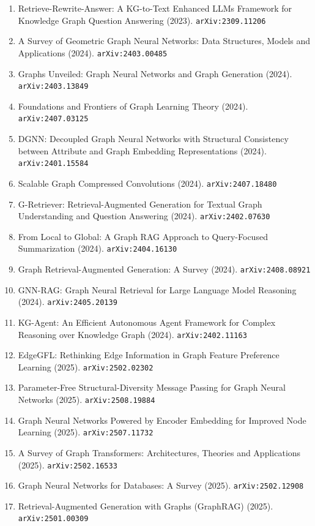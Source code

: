 \documentclass[11pt]{article}
\begin{document}
\begin{enumerate}
  Tasks (2023). \texttt{arXiv:2310.00149}
  \item Retrieve-Rewrite-Answer: A KG-to-Text Enhanced LLMs Framework for
  Knowledge Graph Question Answering (2023). \texttt{arXiv:2309.11206}
  \item A Survey of Geometric Graph Neural Networks: Data Structures, Models and Applications (2024). \texttt{arXiv:2403.00485}
  \item Graphs Unveiled: Graph Neural Networks and Graph Generation (2024). \texttt{arXiv:2403.13849}
  \item Foundations and Frontiers of Graph Learning Theory (2024). \texttt{arXiv:2407.03125}
  \item DGNN: Decoupled Graph Neural Networks with Structural Consistency
  between Attribute and Graph Embedding Representations (2024). \texttt{arXiv:2401.15584}
  \item Scalable Graph Compressed Convolutions (2024). \texttt{arXiv:2407.18480}
  \item G-Retriever: Retrieval-Augmented Generation for Textual Graph
  Understanding and Question Answering (2024). \texttt{arXiv:2402.07630}
  \item From Local to Global: A Graph RAG Approach to Query-Focused
  Summarization (2024). \texttt{arXiv:2404.16130}
  \item Graph Retrieval-Augmented Generation: A Survey (2024). \texttt{arXiv:2408.08921}
  \item GNN-RAG: Graph Neural Retrieval for Large Language Model Reasoning (2024). \texttt{arXiv:2405.20139}
  \item KG-Agent: An Efficient Autonomous Agent Framework for Complex Reasoning
  over Knowledge Graph (2024). \texttt{arXiv:2402.11163}
  \item EdgeGFL: Rethinking Edge Information in Graph Feature Preference
  Learning (2025). \texttt{arXiv:2502.02302}
  \item Parameter-Free Structural-Diversity Message Passing for Graph Neural Networks (2025). \texttt{arXiv:2508.19884}
  \item Graph Neural Networks Powered by Encoder Embedding for Improved Node Learning (2025). \texttt{arXiv:2507.11732}
  \item A Survey of Graph Transformers: Architectures, Theories and Applications (2025). \texttt{arXiv:2502.16533}
  \item Graph Neural Networks for Databases: A Survey (2025). \texttt{arXiv:2502.12908}
  \item Retrieval-Augmented Generation with Graphs (GraphRAG) (2025). \texttt{arXiv:2501.00309}

\end{enumerate}
\end{document}
